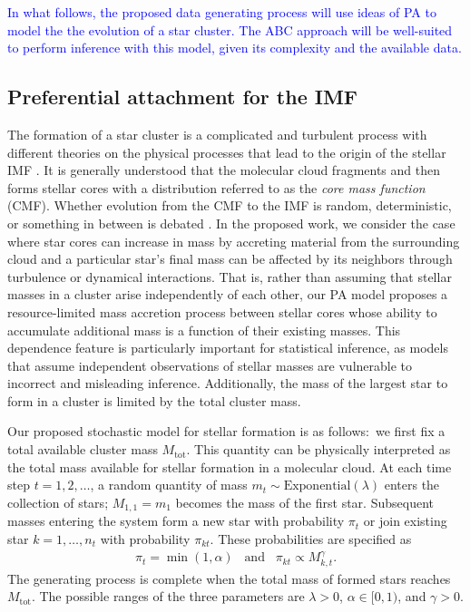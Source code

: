 \documentclass[ejs]{imsart}
\numberwithin{equation}{section}
\theoremstyle{plain}
\newcommand{\Mtot}{M_{\text{tot}}}
\begin{document}
\textcolor{blue}{
In what follows, the proposed data generating process will use ideas of PA
to model the the evolution of a star cluster. The ABC approach will be
well-suited to perform inference with this model, given its complexity and
the available data.
}

\subsection{Preferential attachment for the IMF} \label{sec:pa}
The formation of a star cluster is a complicated and turbulent process with different theories on the physical processes that lead to the origin of the stellar IMF \citep{chabrier2005, Bate2012, OffnerEtAl2014, Pokhrel:2018nr}.  It is generally understood that the molecular cloud fragments and then forms stellar cores with a distribution referred to as the \emph{core mass function} (CMF).  Whether evolution from the CMF to the IMF is random, deterministic, or something in between is debated \citep{OffnerEtAl2014}.  In the proposed work, we consider the case where star cores can increase in mass by accreting material from the surrounding cloud and a particular star's final mass can be affected by its neighbors through turbulence or dynamical interactions.
%
That is, rather than assuming that stellar masses in a cluster arise independently of each other, our PA model proposes a resource-limited mass accretion process between stellar cores whose ability to accumulate additional mass is a function of their existing masses. 
This dependence feature is particularly important for statistical inference, as models that assume independent observations of stellar masses are vulnerable to incorrect and misleading inference. 
Additionally, the mass of the largest star to form in a cluster is limited by the total cluster mass.



Our proposed stochastic model for stellar formation is as follows:~we first fix a total available cluster mass $\Mtot$. 
This quantity can be physically interpreted as the total mass available for stellar formation in a molecular cloud. 
At each time step $t = 1, 2, \ldots$, a random quantity of mass $m_t \sim \text{Exponential}(\lambda)$ enters the collection of stars; $M_{1,1} = m_1$ becomes the mass of the first star.
Subsequent masses entering the system form a new star with probability $\pi_t$ or join existing star $k = 1, \ldots, n_t$ with probability $\pi_{kt}$.
These probabilities are specified as
\begin{align}
	\pi_t = \min \left (1, \alpha \right ) \;\;\; \text{and} \;\;\; \pi_{kt} \propto M_{k,t}^{\gamma}\text{.}
\label{eq:PAstars}
\end{align}
The generating process is complete when the total mass of formed stars reaches $\Mtot$. 
The possible ranges of the three parameters are $\lambda > 0$, $\alpha \in [0,1)$, and $\gamma > 0$. 
\end{document}
